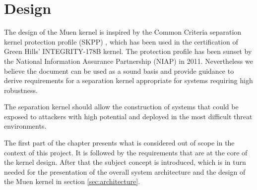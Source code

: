 \chapter{Design}\label{chap:design}
The design of the Muen kernel is inspired by the Common Criteria separation
kernel protection profile (SKPP) \cite{SKPP}, which has been used in the
certification of Green Hills' INTEGRITY-178B kernel. The protection profile has
been sunset by the National Information Assurance Partnership (NIAP) in 2011.
Nevertheless we believe the document can be used as a sound basis and provide
guidance to derive requirements for a separation kernel appropriate for systems
requiring high robustness.

The separation kernel should allow the construction of systems that could be
exposed to attackers with high potential and deployed in the most difficult
threat environments.

The first part of the chapter presents what is considered out of scope in the
context of this project. It is followed by the requirements that are at the core
of the kernel design. After that the subject concept is introduced, which is in
turn needed for the presentation of the overall system architecture and the
design of the Muen kernel in section \ref{sec:architecture}.





